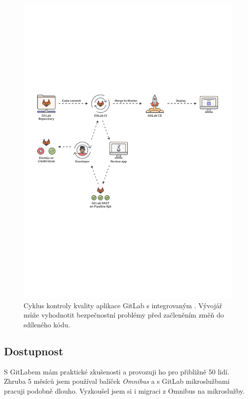         \begin{figure}[hb]
            \centering
            \includegraphics[width=\textwidth]{media/gitlab-review-cycle.pdf}
            \caption{Cyklus kontroly kvality aplikace GitLab s integrovaným  \cite{gitlab-app-security}. Vývojář může vyhodnotit bezpečnostní problémy před začleněním změň do sdíleného kódu.}
            \label{fig:gitlab-review-cycle}
        \end{figure}

        \blind[1]

    \subsection{Dostupnost}
        S GitLabem mám praktické zkušenosti a provozuji ho pro přibližně 50 lidí. Zhruba 5 měsíců jsem používal balíček \textit{Omnibus} a s GitLab mikroslužbami pracuji podobně dlouho. Vyzkoušel jsem si i migraci z Omnibus na mikroslužby.

